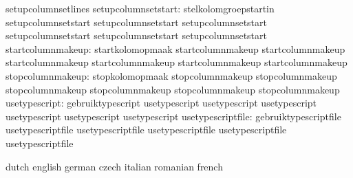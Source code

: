                                   setupcolumnsetlines
             setupcolumnsetstart: stelkolomgroepstartin            setupcolumnsetstart
                                  setupcolumnsetstart              setupcolumnsetstart
                                  setupcolumnsetstart              setupcolumnsetstart
                                  setupcolumnsetstart
               startcolumnmakeup: startkolomopmaak                 startcolumnmakeup
                                  startcolumnmakeup                startcolumnmakeup
                                  startcolumnmakeup                startcolumnmakeup
                                  startcolumnmakeup
                stopcolumnmakeup: stopkolomopmaak                  stopcolumnmakeup
                                  stopcolumnmakeup                 stopcolumnmakeup
                                  stopcolumnmakeup                 stopcolumnmakeup
                                  stopcolumnmakeup
                   usetypescript: gebruiktypescript                usetypescript
                                  usetypescript                    usetypescript
                                  usetypescript                    usetypescript
                                  usetypescript
               usetypescriptfile: gebruiktypescriptfile            usetypescriptfile
                                  usetypescriptfile                usetypescriptfile
                                  usetypescriptfile                usetypescriptfile

\stopcommands




\startcommands                    dutch                            english
                                  german                           czech
                                  italian                          romanian
                                  french

